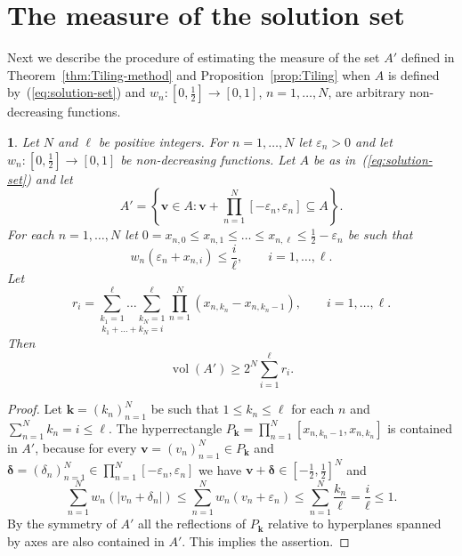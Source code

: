 \documentclass[oneside,english]{amsart}
\numberwithin{equation}{section}
\numberwithin{figure}{section}
\theoremstyle{plain}
\theoremstyle{plain}
\theoremstyle{plain}
\newtheorem{lem}{\protect\lemmaname}
\theoremstyle{definition}
\providecommand{\lemmaname}{Lemma}
\begin{document}
\section{The measure of the solution set}

Next we describe the procedure of estimating the measure of the set
$A'$ defined in Theorem~\ref{thm:Tiling-method} and Proposition~\ref{prop:Tiling}
when $A$ is defined by~(\ref{eq:solution-set}) and $w_{n}:\left[0,\frac{1}{2}\right]\to[0,1]$,
$n=1,\dotsc,N$, are arbitrary non-decreasing functions.
\begin{lem}
\label{lem:volume}Let $N$ and $\ell$ be positive integers. For
$n=1,\dotsc,N$ let $\varepsilon_{n}>0$ and let $w_{n}:\left[0,\tfrac{1}{2}\right]\to[0,1]$
be non-decreasing functions. Let $A$ be as in~(\ref{eq:solution-set})
and let 
\[
A'=\left\{ \boldsymbol{v}\in A:\boldsymbol{v}+\prod_{n=1}^{N}\left[-\varepsilon_{n},\varepsilon_{n}\right]\subseteq A\right\} .
\]
For each $n=1,\dotsc,N$ let $0=x_{n,0}\leq x_{n,1}\leq\dotsc\leq x_{n,\ell}\leq\tfrac{1}{2}-\varepsilon_{n}$
be such that
\[
w_{n}\left(\varepsilon_{n}+x_{n,i}\right)\leq\frac{i}{\ell},\qquad i=1,\dotsc,\ell.
\]
Let
\[
r_{i}=\underset{k_{1}+\dotsc+k_{N}=i}{\sum_{k_{1}=1}^{\ell}\dotsc\sum_{k_{N}=1}^{\ell}}\prod_{n=1}^{N}\left(x_{n,k_{n}}-x_{n,k_{n}-1}\right),\qquad i=1,\dotsc,\ell.
\]
Then
\begin{equation}
\operatorname{vol}(A')\geq2^{N}\sum_{i=1}^{\ell}r_{i}.\label{eq:volume}
\end{equation}
\end{lem}
\begin{proof}
Let $\boldsymbol{k}=(k_{n})_{n=1}^{N}$ be such that $1\leq k_{n}\leq\ell$
for each $n$ and $\sum_{n=1}^{N}k_{n}=i\leq\ell$. The hyperrectangle
$P_{\boldsymbol{k}}=\prod_{n=1}^{N}\left[x_{n,k_{n}-1},x_{n,k_{n}}\right]$
is contained in $A'$, because for every $\boldsymbol{v}=\left(v_{n}\right)_{n=1}^{N}\in P_{\boldsymbol{k}}$
and $\boldsymbol{\delta}=\left(\delta_{n}\right)_{n=1}^{N}\in\prod_{n=1}^{N}\left[-\varepsilon_{n},\varepsilon_{n}\right]$
we have $\boldsymbol{v}+\boldsymbol{\delta}\in\left[-\tfrac{1}{2},\tfrac{1}{2}\right]^{N}$
and
\[
\sum_{n=1}^{N}w_{n}\left(\left|v_{n}+\delta_{n}\right|\right)\leq\sum_{n=1}^{N}w_{n}\left(v_{n}+\varepsilon_{n}\right)\leq\sum_{n=1}^{N}\frac{k_{n}}{\ell}=\frac{i}{\ell}\leq1.
\]
By the symmetry of $A'$ all the reflections of $P_{\boldsymbol{k}}$
relative to hyperplanes spanned by axes are also contained in $A'$.
This implies the assertion.
\end{proof}
\end{document}
